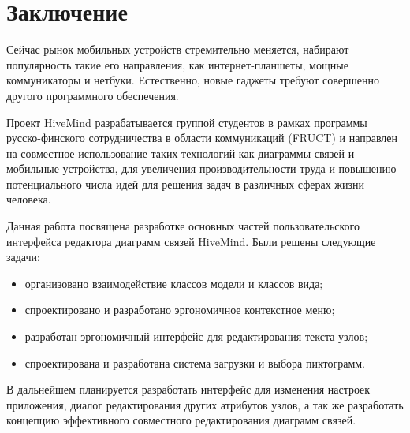 \newpage

\chapter*{Заключение}


Сейчас рынок мобильных устройств стремительно меняется, набирают популярность
такие его направления, как интернет-планшеты, мощные коммуникаторы и нетбуки.
Естественно, новые гаджеты требуют совершенно другого программного обеспечения.

Проект HiveMind разрабатывается группой студентов в рамках программы
русско-финского сотрудничества в области коммуникаций (FRUCT) и направлен на
совместное использование таких технологий как диаграммы связей и мобильные
устройства, для увеличения производительности труда и повышению потенциального
числа идей для решения задач в различных сферах жизни человека.

Данная работа посвящена разработке основных частей пользовательского интерфейса
редактора диаграмм связей HiveMind. Были решены следующие задачи:
\begin{itemize}
\item
организовано взаимодействие классов модели и классов вида;
\item спроектировано и разработано эргономичное контекстное меню;
\item разработан эргономичный интерфейс для редактирования текста узлов;
\item спроектирована и разработана система загрузки и выбора пиктограмм.
\end{itemize}

В дальнейшем планируется разработать интерфейс для изменения настроек
приложения, диалог редактирования других атрибутов узлов, а так же разработать
концепцию эффективного совместного редактирования диаграмм связей.

